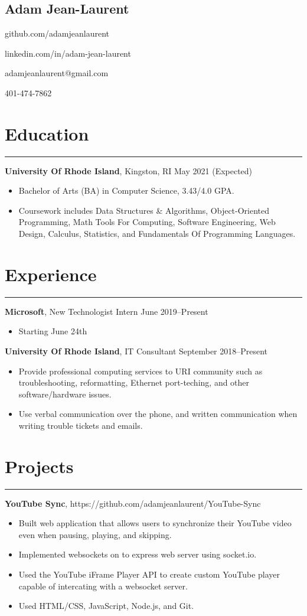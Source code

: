 \documentclass[11pt]{article}
\newcommand{\name}[1]{\begin{center}\section*{\huge #1}\end{center}}
\newcommand{\topinfo}[1]{\begin{center}\vspace{-0.2cm}#1\vspace{-0.2cm}\end{center}}
\newcommand{\resumesection}[1]{\vspace{-0.2cm}\section*{#1}\vspace{-0.2cm}\hrule\vspace{0.2cm}}
\begin{document}
\name{Adam Jean-Laurent}
\topinfo{github.com/adamjeanlaurent}
\topinfo{linkedin.com/in/adam-jean-laurent}
\topinfo{adamjeanlaurent@gmail.com}
\topinfo{401-474-7862}

\resumesection{Education}

\textbf{University Of Rhode Island}, Kingston, RI \hfill May 2021 (Expected)
\begin{itemize}
	\item Bachelor of Arts (BA) in Computer Science, 3.43/4.0 GPA.
	\item Coursework includes Data Structures \& Algorithms, Object-Oriented Programming, Math Tools For Computing, Software Engineering, Web Design, Calculus, Statistics, and Fundamentals Of Programming Languages. 
\end{itemize}

\resumesection{Experience}

\textbf{Microsoft}, New Technologist Intern \hfill June 2019--Present
\begin{itemize}
	\item Starting June 24th
\end{itemize}

\textbf{University Of Rhode Island}, IT Consultant \hfill September 2018--Present
\begin{itemize}
	\item Provide professional computing services to URI community such as troubleshooting, reformatting, Ethernet port-teching, and other software/hardware issues.
	\item Use verbal communication over the phone, and written communication when writing trouble tickets and emails.
\end{itemize}

\resumesection{Projects}

\textbf{YouTube Sync}, https://github.com/adamjeanlaurent/YouTube-Sync  
\begin{itemize}
	\item Built web application that allows users to synchronize their YouTube video even when pausing, playing, and skipping.
	\item Implemented websockets on to express web server using socket.io.
	\item Used the YouTube iFrame Player API to create custom YouTube player capable of intercating with a websocket server.
	\item Used HTML/CSS, JavaScript, Node.js, and Git.
\end{itemize}
\end{document}
